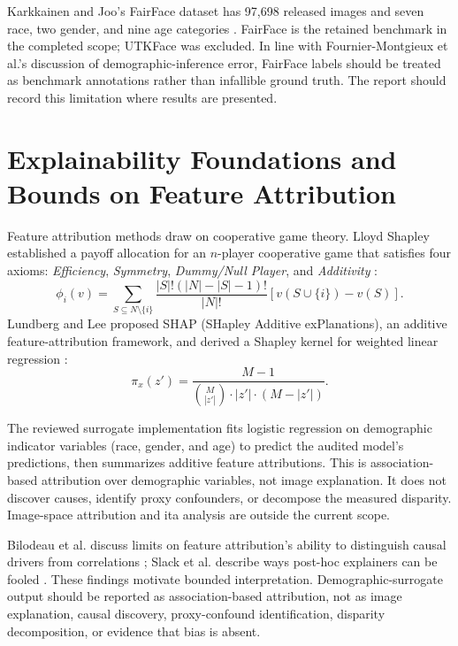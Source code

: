 Karkkainen and Joo's FairFace dataset has 97,698 released images and seven race, two gender, and nine age categories \cite{karkkainen2021fairface}. FairFace is the retained benchmark in the completed scope; UTKFace was excluded. In line with Fournier-Montgieux et al.'s discussion of demographic-inference error, FairFace labels should be treated as benchmark annotations rather than infallible ground truth. The report should record this limitation where results are presented.


\section{Explainability Foundations and Bounds on Feature Attribution}
\label{sec:lit_xai}

Feature attribution methods draw on cooperative game theory. Lloyd Shapley established a payoff allocation for an \(n\)-player cooperative game that satisfies four axioms: \emph{Efficiency}, \emph{Symmetry}, \emph{Dummy/Null Player}, and \emph{Additivity} \cite{shapley1953value}:
\begin{equation}
    \phi_i(v) = \sum_{S \subseteq N \setminus \{i\}} \frac{|S|!(|N| - |S| - 1)!}{|N|!} \left[ v(S \cup \{i\}) - v(S) \right].
\end{equation}
Lundberg and Lee proposed SHAP (SHapley Additive exPlanations), an additive feature-attribution framework, and derived a Shapley kernel for weighted linear regression \cite{lundberg2017unified}:
\begin{equation}
    \pi_x(z') = \frac{M - 1}{\binom{M}{|z'|} \cdot |z'| \cdot (M - |z'|)}.
\end{equation}

The reviewed surrogate implementation fits logistic regression on demographic indicator variables (race, gender, and age) to predict the audited model's predictions, then summarizes additive feature attributions. This is association-based attribution over demographic variables, not image explanation. It does not discover causes, identify proxy confounders, or decompose the measured disparity. Image-space attribution and \gls{ita} analysis are outside the current scope.

Bilodeau et al. discuss limits on feature attribution's ability to distinguish causal drivers from correlations \cite{bilodeau2022impossibility}; Slack et al. describe ways post-hoc explainers can be fooled \cite{slack2020fooling}. These findings motivate bounded interpretation. Demographic-surrogate output should be reported as association-based attribution, not as image explanation, causal discovery, proxy-confound identification, disparity decomposition, or evidence that bias is absent.


